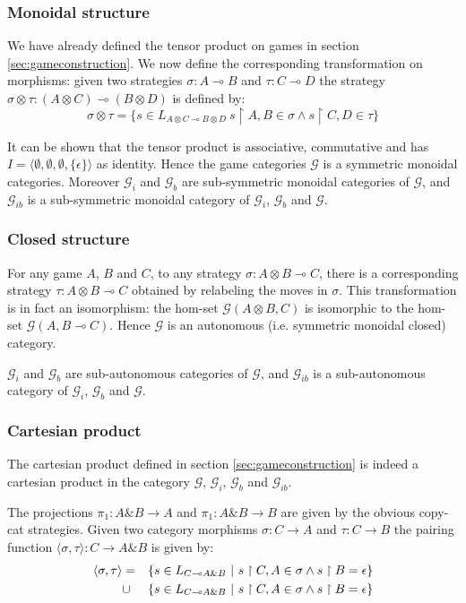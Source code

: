 \subsubsection{Monoidal structure}

We have already defined the tensor product on games in section \ref{sec:gameconstruction}.
We now define the corresponding transformation on morphisms:
given two strategies $\sigma : A \multimap B$ and $\tau : C \multimap D$ the strategy
$\sigma \otimes \tau : (A \otimes C) \multimap (B\otimes D)$ is defined by:
$$ \sigma \otimes \tau = \{ s \in L_{A \otimes C \multimap B\otimes D} \ s \upharpoonright A,B \in \sigma
\wedge s \upharpoonright C,D \in \tau \}$$

It can be shown that the tensor product is associative, commutative and has
$I = \langle \emptyset, \emptyset,\emptyset, \{ \epsilon \} \rangle $ as identity.
Hence the game categories $\mathcal{G}$ is a symmetric monoidal categories. Moreover
$\mathcal{G}_i$ and  $\mathcal{G}_b$ are sub-symmetric monoidal categories of $\mathcal{G}$,
and $\mathcal{G}_{ib}$ is a sub-symmetric monoidal category of $\mathcal{G}_i$, $\mathcal{G}_b$ and
$\mathcal{G}$.

\subsubsection{Closed structure}

For any game $A$, $B$ and $C$,
to any strategy $\sigma : A\otimes B \multimap C$, there is a corresponding strategy
$\tau : A\otimes B \multimap C$ obtained by relabeling the moves in $\sigma$. This transformation
is in fact an isomorphism: the hom-set $\mathcal{G}(A\otimes B, C)$ is isomorphic to the hom-set
$\mathcal{G}(A,B\multimap C)$. Hence $\mathcal{G}$ is an autonomous (i.e. symmetric monoidal closed) category.

$\mathcal{G}_i$ and  $\mathcal{G}_b$ are sub-autonomous categories of $\mathcal{G}$,
and $\mathcal{G}_{ib}$ is a sub-autonomous category of $\mathcal{G}_i$, $\mathcal{G}_b$ and
$\mathcal{G}$.

\subsubsection{Cartesian product}
The cartesian product defined in section \ref{sec:gameconstruction} is indeed a cartesian product in the category
$\mathcal{G}$, $\mathcal{G}_i$, $\mathcal{G}_b$ and $\mathcal{G}_{ib}$.

The projections $\pi_1:A \& B \rightarrow A$ and $\pi_1:A \& B \rightarrow B$ are given by the obvious copy-cat strategies.
Given two category morphisms $\sigma :C \rightarrow A$ and $\tau : C \rightarrow B$ the pairing function
$\langle \sigma, \tau \rangle : C \rightarrow A \& B$ is given by:
\begin{eqnarray*}
\langle \sigma, \tau \rangle &=& \{ s \in L_{C\multimap A\&B} \ | \ s \upharpoonright C,A \in \sigma \wedge s \upharpoonright B = \epsilon  \} \\
&\cup& \{ s \in L_{C\multimap A\&B} \ | \ s \upharpoonright C,A \in \sigma \wedge s \upharpoonright B = \epsilon  \}
\end{eqnarray*}

